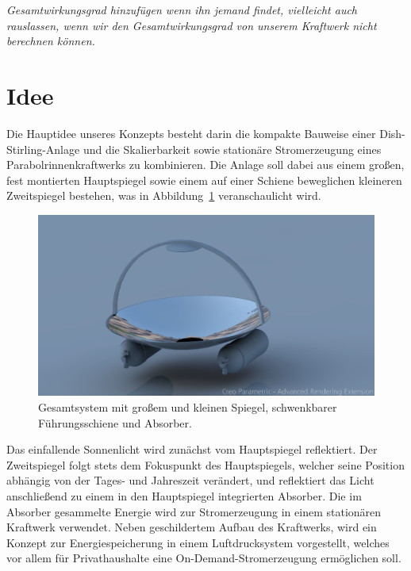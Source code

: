 \documentclass[fontsize=10pt,paper=a4,bibliography=totoc]{scrartcl}
\newcommand{\felix}[1]{{ \color{darkgreen} #1}}
\newcommand{\maxim}[1]{{ \color{blue} #1}}
\newcommand{\todo}[1]{{\color{magenta}#1}}
\begin{document}
\emph{Gesamtwirkungsgrad hinzufügen wenn ihn jemand findet, vielleicht auch rauslassen, wenn wir den Gesamtwirkungsgrad von unserem Kraftwerk nicht berechnen können.}

\section{Idee}


\maxim{
Die Hauptidee unseres Konzepts besteht darin die kompakte Bauweise einer Dish-Stirling-Anlage und die Skalierbarkeit sowie stationäre Stromerzeugung eines Parabolrinnenkraftwerks zu kombinieren. Die Anlage soll dabei aus einem großen, fest montierten Hauptspiegel sowie einem auf einer Schiene beweglichen kleineren Zweitspiegel bestehen,} \felix{ was in Abbildung~\ref{pic:system_rendered} veranschaulicht wird.}

\begin{figure}[htb]
	\centering
	\includegraphics[width=\textwidth]{images/SMALL_MIRROR}
	\caption[Gesamtsystem]{Gesamtsystem mit großem und kleinen Spiegel, schwenkbarer Führungsschiene und Absorber.}
	\label{pic:system_rendered}
\end{figure}

\maxim{Das einfallende Sonnenlicht wird zunächst vom Hauptspiegel reflektiert. Der Zweitspiegel folgt stets dem Fokuspunkt des Hauptspiegels, welcher seine Position abhängig von der Tages- und Jahreszeit verändert, und reflektiert das Licht anschließend zu einem in den Hauptspiegel integrierten Absorber.  Die im Absorber gesammelte Energie wird zur Stromerzeugung in einem stationären Kraftwerk verwendet.
\hfill\newline %
\hfill\newline
Neben geschildertem Aufbau des Kraftwerks, wird ein Konzept zur Energiespeicherung in einem Luftdrucksystem vorgestellt, welches vor allem für Privathaushalte eine On-Demand-Stromerzeugung ermöglichen soll.
}
\hfill \newline
\end{document}
